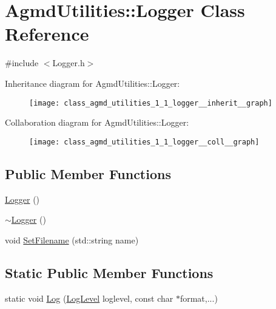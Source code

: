 \hypertarget{class_agmd_utilities_1_1_logger}{\section{Agmd\+Utilities\+:\+:Logger Class Reference}
\label{class_agmd_utilities_1_1_logger}
}


{\ttfamily \#include $<$Logger.\+h$>$}



Inheritance diagram for Agmd\+Utilities\+:\+:Logger\+:\nopagebreak
\begin{figure}[H]
\begin{center}
\leavevmode
\texttt{[image: class\_agmd\_utilities\_1\_1\_logger\_\_inherit\_\_graph]}
\end{center}
\end{figure}


Collaboration diagram for Agmd\+Utilities\+:\+:Logger\+:\nopagebreak
\begin{figure}[H]
\begin{center}
\leavevmode
\texttt{[image: class\_agmd\_utilities\_1\_1\_logger\_\_coll\_\_graph]}
\end{center}
\end{figure}
\subsection*{Public Member Functions}
\begin{DoxyCompactItemize}
\item 
\hyperlink{class_agmd_utilities_1_1_logger_a8af6a5f07c789cfe024d1b8340bee575}{Logger} ()
\item 
\hyperlink{class_agmd_utilities_1_1_logger_a28ed0b369d53914a410734ce5862b8ea}{$\sim$\+Logger} ()
\item 
void \hyperlink{class_agmd_utilities_1_1_logger_aa1c8b53d5a824a45319701ea57a3d69c}{Set\+Filename} (std\+::string name)
\end{DoxyCompactItemize}
\subsection*{Static Public Member Functions}
\begin{DoxyCompactItemize}
\item 
static void \hyperlink{class_agmd_utilities_1_1_logger_adb08cbeabef52efee204bf2a4a929570}{Log} (\hyperlink{namespace_agmd_utilities_a29e36cc332c9462e3dffc7c2e6b27645}{Log\+Level} loglevel, const char $\ast$format,...)
\end{DoxyCompactItemize}

